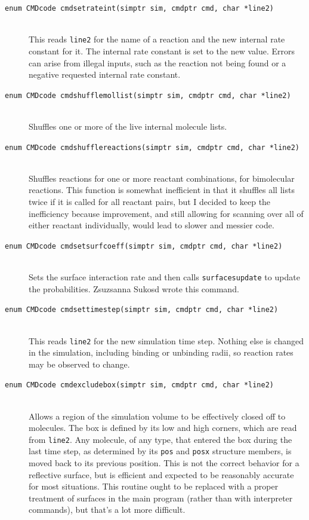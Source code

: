 \documentclass {scrbook}
\newcommand {\ttt} {\texttt}
\begin{document}
\begin{description}
\item[\ttt{enum CMDcode cmdsetrateint(simptr sim, cmdptr cmd, char *line2)}]
\hfill \\
This reads \ttt{line2} for the name of a reaction and the new internal rate constant for it. The internal rate constant is set to the new value. Errors can arise from illegal inputs, such as the reaction not being found or a negative requested internal rate constant.

\item[\ttt{enum CMDcode cmdshufflemollist(simptr sim, cmdptr cmd, char *line2)}]
\hfill \\
Shuffles one or more of the live internal molecule lists.

\item[\ttt{enum CMDcode cmdshufflereactions(simptr sim, cmdptr cmd, char *line2)}]
\hfill \\
Shuffles reactions for one or more reactant combinations, for bimolecular reactions. This function is somewhat inefficient in that it shuffles all lists twice if it is called for all reactant pairs, but I decided to keep the inefficiency because improvement, and still allowing for scanning over all of either reactant individually, would lead to slower and messier code.

\item[\ttt{enum CMDcode cmdsetsurfcoeff(simptr sim, cmdptr cmd, char *line2)}]
\hfill \\
Sets the surface interaction rate and then calls \ttt{surfacesupdate} to update the probabilities. Zsuzsanna Sukosd wrote this command.

\item[\ttt{enum CMDcode cmdsettimestep(simptr sim, cmdptr cmd, char *line2)}]
\hfill \\
This reads \ttt{line2} for the new simulation time step. Nothing else is changed in the simulation, including binding or unbinding radii, so reaction rates may be observed to change.

\item[\ttt{enum CMDcode cmdexcludebox(simptr sim, cmdptr cmd, char *line2)}]
\hfill \\
Allows a region of the simulation volume to be effectively closed off to molecules. The box is defined by its low and high corners, which are read from \ttt{line2}. Any molecule, of any type, that entered the box during the last time step, as determined by its \ttt{pos} and \ttt{posx} structure members, is moved back to its previous position. This is not the correct behavior for a reflective surface, but is efficient and expected to be reasonably accurate for most situations. This routine ought to be replaced with a proper treatment of surfaces in the main program (rather than with interpreter commands), but that's a lot more difficult.


\end{description}
\end{document}
